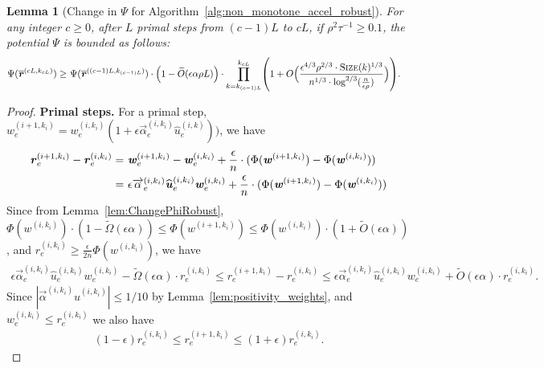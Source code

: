 \documentclass[11pt]{article}
\newtheorem{lemma}[theorem]{Lemma}
\let\originalleft\left
\let\originalright\right
\renewcommand{\left}{\mathopen{}\mathclose\bgroup\originalleft}
\renewcommand{\right}{\aftergroup\egroup\originalright}
\newcommand\rr{\boldsymbol{\mathit{r}}}
\newcommand\uu{\boldsymbol{\mathit{u}}}
\newcommand\ww{\boldsymbol{\mathit{w}}}
\newcommand{\wh}{\widehat}
\newcommand{\wt}{\widetilde}
\newcommand{\ov}{\overline}
\begin{document}
\begin{lemma}[Change in $\Psi$ for Algorithm~\ref{alg:non_monotone_accel_robust}]\label{lem:ChangePsiRobust}
For any integer $c \geq 0$, after $L$ primal steps from $(c-1)L$ to $cL$, if $\rho^2 \tau^{-1} \geq 0.1$, the potential $\Psi$ is bounded as follows:
\begin{align*}
\Psi(\ov{\rr}^{(cL,k_{cL})}) 
\geq &~ \Psi(\ov{\rr}^{((c-1)L,k_{(c-1)L})}) \cdot \Big(1 -  \wt{O}(\epsilon \alpha \rho L) \Big) \cdot \prod_{k=k_{(c-1)L}}^{k_{cL}} \left( 1 + O\Big(\frac{\epsilon^{4/3} \rho^{2/3} \cdot \textsc{Size}(k)^{1/3}}{n^{1/3} \cdot \log^{2/3}(\frac{n}{\epsilon \rho})}\Big) \right).
\end{align*}
\end{lemma}
\begin{proof}
{\bf Primal steps.}
For a primal step, $\ww_e^{(i+1,k_i)} = \ww_e^{(i,k_i)}(1+\epsilon\overrightarrow{\alpha}^{(i,k_i)}_e \wh{\uu}^{(i,k)}_e))$, we have
\begin{align*}
\rr^{(i+1,k_i)}_e - \rr^{(i,k_i)}_e = &~ \ww^{(i+1,k_i)}_e - \ww^{(i,k_i)}_e + \frac{\epsilon}{n} \cdot (\Phi(\ww^{(i+1,k_i)}) - \Phi(\ww^{(i,k_i)})) \notag \\
= &~ \epsilon \overrightarrow{\alpha}_e^{(i,k_i)}  \wh{\uu}^{(i,k_i)}_e \ww^{(i,k_i)}_e + \frac{\epsilon}{n} \cdot (\Phi(\ww^{(i+1,k_i)}) - \Phi(\ww^{(i,k_i)})) \notag
\end{align*}
Since from Lemma~\ref{lem:ChangePhiRobust}, $\Phi(\ww^{(i,k_i)}) \cdot (1-\wt{\Omega}(\epsilon\alpha)) \leq \Phi(\ww^{(i+1,k_i)}) \leq \Phi(\ww^{(i,k_i)}) \cdot (1+\wt{O}(\epsilon\alpha))$, and $\rr_e^{(i,k_i)} \geq \frac{\epsilon}{2n} \Phi(\ww^{(i,k_i)})$, we have
\begin{align}\label{eq:r_i_diff_bounds}
\epsilon \overrightarrow{\alpha}_e^{(i,k_i)}  \wh{\uu}^{(i,k_i)}_e \ww^{(i,k_i)}_e - \wt{\Omega}(\epsilon\alpha) \cdot \rr_e^{(i,k_i)} \leq \rr^{(i+1,k_i)}_e - \rr^{(i,k_i)}_e \leq \epsilon \overrightarrow{\alpha}_e^{(i,k_i)}  \wh{\uu}^{(i,k_i)}_e \ww^{(i,k_i)}_e + \wt{O}(\epsilon\alpha) \cdot \rr_e^{(i,k_i)}.
\end{align}
Since $|\overrightarrow{\alpha}^{(i,k_i)} \wh{\uu}^{(i,k_i)}| \leq 1 / 10$ by Lemma~\ref{lem:positivity_weights}, and $\ww_e^{(i,k_i)} \leq \rr_e^{(i,k_i)}$ we also have 
\begin{align}\label{eq:r_i_diff_bounds_2}
(1 - \epsilon) \rr_e^{(i,k_i)} \leq \rr_e^{(i+1,k_i)} \leq (1 + \epsilon) \rr_e^{(i,k_i)}.
\end{align}


\end{proof}
\end{document}
